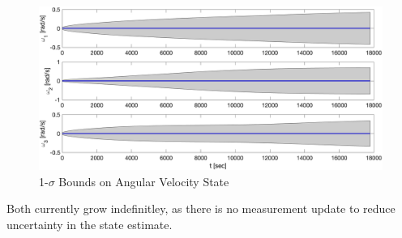 \begin{figure}[H]
    \centering
    \captionsetup{ justification = centering}
    \includegraphics[width = 15cm]{Images/PS7/kalman_filter_omega_cov_bounds.png}
    \caption{1-$\sigma$ Bounds on Angular Velocity State}
    \label{fig:kf_time_update_vel_statistics}
\end{figure}

Both currently grow indefinitley, as there is no measurement update to reduce uncertainty in the state estimate.
